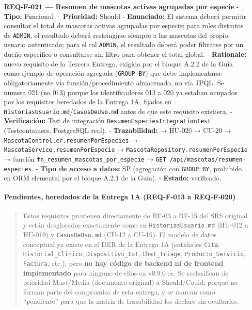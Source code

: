 \documentclass[
]{article}
\begin{document}
\textbf{REQ-F-021 --- Resumen de mascotas activas agrupadas por especie}
- \textbf{Tipo:} Funcional · \textbf{Prioridad:} Should -
\textbf{Enunciado:} El sistema deberá permitir consultar el total de
mascotas activas agrupadas por especie; para roles distintos de
\texttt{ADMIN}, el resultado deberá restringirse siempre a las mascotas
del propio usuario autenticado; para el rol \texttt{ADMIN}, el resultado
deberá poder filtrarse por un dueño específico o consultarse sin filtro
para obtener el total global. - \textbf{Rationale:} nuevo requisito de
la Tercera Entrega, exigido por el bloque A.2.2 de la Guía como ejemplo
de operación agregada (\texttt{GROUP\ BY}) que debe implementarse
obligatoriamente vía función/procedimiento almacenado, no vía JPQL. Se
numera 021 (no 013) porque los identificadores 013 a 020 ya estaban
ocupados por los requisitos heredados de la Entrega 1A, fijados en
\texttt{HistoriasUsuario.md}/\texttt{CasosDeUso.md} antes de que este
requisito existiera. - \textbf{Verificación:} Test de integración
\texttt{ResumenEspeciesIntegrationTest} (Testcontainers, PostgreSQL
real). - \textbf{Trazabilidad:} → HU-020 → CU-20 →
\texttt{MascotaController.resumenPorEspecies} →
\texttt{MascotaService.resumenPorEspecie} →
\texttt{MascotaRepository.resumenPorEspecie} → función
\texttt{fn\_resumen\_mascotas\_por\_especie} →
\texttt{GET\ /api/mascotas/resumen-especies}. - \textbf{Tipo de acceso a
datos:} SP (agregación con \texttt{GROUP\ BY}, prohibido en ORM
elemental por el bloque A.2.1 de la Guía). - \textbf{Estado:}
verificado.

\hypertarget{pendientes-heredados-de-la-entrega-1a-req-f-013-a-req-f-020}{%
\paragraph{Pendientes, heredados de la Entrega 1A (REQ-F-013 a
REQ-F-020)}\label{pendientes-heredados-de-la-entrega-1a-req-f-013-a-req-f-020}}

\begin{quote}
Estos requisitos provienen directamente de RF-03 a RF-15 del SRS
original y están desglosados exactamente como en
\texttt{HistoriasUsuario.md} (HU-012 a HU-019) y \texttt{CasosDeUso.md}
(CU-12 a CU-19). El modelo de datos conceptual ya existe en el DER de la
Entrega 1A (entidades \texttt{Cita}, \texttt{Historial\_Clinico},
\texttt{Dispositivo\_IoT}, \texttt{Chat\_Triage},
\texttt{Producto\_Servicio}, \texttt{Factura}, etc.), pero \textbf{no
hay código de backend ni de frontend implementado} para ninguno de ellos
en v0.9.0-rc. Se reclasifican de prioridad Must/Media (documento
original) a Should/Could, porque no forman parte del compromiso de esta
entrega, y se marcan como ``pendiente'' para que la matriz de
trazabilidad los declare sin ocultarlos.
\end{quote}
\end{document}
